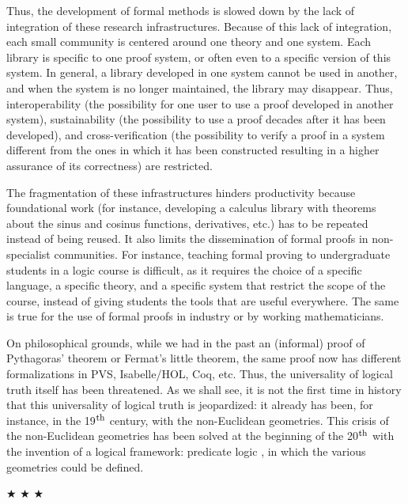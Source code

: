 Thus, the development of formal methods is slowed down by the lack of
integration of these research infrastructures.  Because of this lack
of integration, each small community is centered around one theory and
one system. Each library is specific to one proof system, or often
even to a specific version of this system. In general, a library
developed in one system cannot be used in another, and when the system
is no longer maintained, the library may disappear.  Thus,
interoperability (the possibility for one user to use a proof
developed in another system), sustainability (the possibility to use a
proof decades after it has been developed), and cross-verification
(the possibility to verify a proof in a system different from the ones in
which it has been constructed resulting in a higher assurance of its
correctness) are restricted.

The fragmentation of these infrastructures hinders productivity
because foundational work (for instance, developing a calculus library
with theorems about the sinus and cosinus functions, derivatives,
etc.) has to be repeated instead of being reused.  It also limits the
dissemination of formal proofs in non-specialist communities. For
instance, teaching formal proving to undergraduate students in a logic
course is difficult, as it requires the choice of a specific language,
a specific theory, and a specific system that restrict the scope of the
course, instead of giving students the tools that are useful
everywhere. The same is true for the use of formal proofs in industry
or by working mathematicians.

On philosophical grounds, while we had in the past an (informal) proof
of Pythagoras' theorem or Fermat's little theorem, the same proof now
has different formalizations in PVS, Isabelle/HOL, Coq, etc.  Thus,
the universality of logical truth itself has been threatened. 
As we shall
see, it is not the first time in history that this universality of
logical truth is jeopardized: it already has been, for instance, in
the 19$^{\mbox{\footnotesize th}}$ century, with the non-Euclidean
geometries. This crisis of the non-Euclidean geometries has been
solved at the beginning of the 20$^{\mbox{\footnotesize th}}$ with the
invention of a logical framework: predicate logic
\cite{HilbertAckermann}, in which the various geometries could be
defined.

\begin{center}
$\bigstar$ $\bigstar$ $\bigstar$
\end{center}

